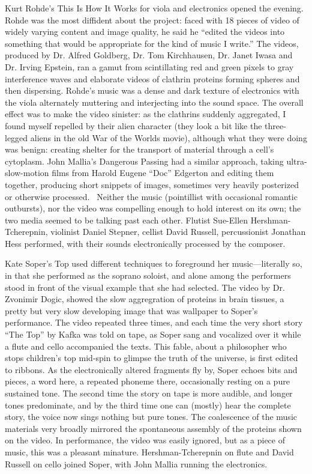 Kurt Rohde’s This Is How It Works for viola and electronics opened the evening. Rohde was the most diffident about the project: faced with 18 pieces of video of widely varying content and image quality, he said he “edited the videos into something that would be appropriate for the kind of music I write.” The videos, produced by Dr. Alfred Goldberg, Dr. Tom Kirchhausen, Dr. Janet Iwasa and Dr. Irving Epstein, ran a gamut from scintillating red and green pixels to gray interference waves and elaborate videos of clathrin proteins forming spheres and then dispersing. Rohde’s music was a dense and dark texture of electronics with the viola alternately muttering and interjecting into the sound space. The overall effect was to make the video sinister: as the clathrins suddenly aggregated, I found myself repelled by their alien character (they look a bit like the three-legged aliens in the old War of the Worlds movie), although what they were doing was benign: creating shelter for the transport of material through a cell’s cytoplasm. John Mallia’s Dangerous Passing had a similar approach, taking ultra-slow-motion films from Harold Eugene “Doc” Edgerton and editing them together, producing short snippets of images, sometimes very heavily posterized or otherwise processed.  Neither the music (pointillist with occasional romantic outbursts), nor the video was compelling enough to hold interest on its own; the two media seemed to be talking past each other. Flutist Sue-Ellen Hershman-Tcherepnin, violinist Daniel Stepner, cellist David Russell, percussionist Jonathan Hess performed, with their sounds electronically processed by the composer.

Kate Soper’s Top used different techniques to foreground her music—literally so, in that she performed as the soprano soloist, and alone among the performers stood in front of the visual example that she had selected. The video by Dr. Zvonimir Dogic, showed the slow aggregration of proteins in brain tissues, a pretty but very slow developing image that was wallpaper to Soper’s performance. The video repeated three times, and each time the very short story “The Top” by Kafka was told on tape, as Soper sang and vocalized over it while a flute and cello accompanied the texts. This fable, about a philosopher who stops children’s top mid-spin to glimpse the truth of the universe, is first edited to ribbons. As the electronically altered fragments fly by, Soper echoes bits and pieces, a word here, a repeated phoneme there, occasionally resting on a pure sustained tone. The second time the story on tape is more audible, and longer tones predominate, and by the third time one can (mostly) hear the complete story, the voice now sings nothing but pure tones. The coalescence of the music materials very broadly mirrored the spontaneous assembly of the proteins shown on the video. In performance, the video was easily ignored, but as a piece of music, this was a pleasant minature. Hershman-Tcherepnin on flute and David Russell on cello joined Soper, with John Mallia running the electronics.

